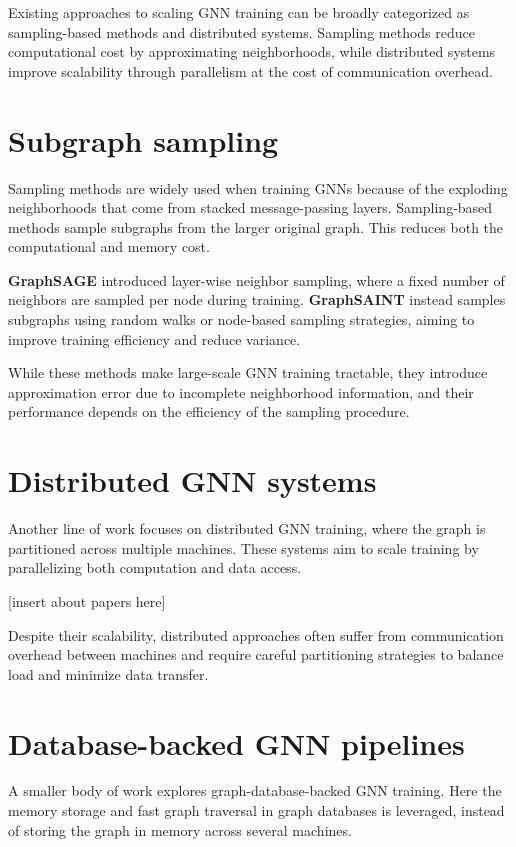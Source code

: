 \documentclass[PhD,single]{uclathes}
\begin{document}
Existing approaches to scaling GNN training can be broadly categorized as
sampling-based methods and distributed systems. Sampling methods reduce
computational cost by approximating neighborhoods, while distributed systems
improve scalability through parallelism at the cost of communication overhead.

\section{Subgraph sampling}
Sampling methods are widely used when training GNNs because of the exploding
neighborhoods that come from stacked message-passing layers. Sampling-based
methods sample subgraphs from the larger original graph. This reduces both the
computational and memory cost.

\textbf{GraphSAGE} introduced layer-wise neighbor sampling, where a fixed
number of neighbors are sampled per node during training. \textbf{GraphSAINT}
instead samples subgraphs using random walks or node-based sampling strategies,
aiming to improve training efficiency and reduce variance.

While these methods make large-scale GNN training tractable, they introduce
approximation error due to incomplete neighborhood information, and their
performance depends on the efficiency of the sampling procedure.

\section{Distributed GNN systems}
Another line of work focuses on distributed GNN training, where the graph is
partitioned across multiple machines. These systems aim to scale training by
parallelizing both computation and data access.

[insert about papers here]

Despite their scalability, distributed approaches often suffer from
communication overhead between machines and require careful partitioning
strategies to balance load and minimize data transfer.

\section{Database-backed GNN pipelines}
A smaller body of work explores graph-database-backed GNN training. Here the
memory storage and fast graph traversal in graph databases is leveraged,
instead of storing the graph in memory across several machines.
\end{document}
